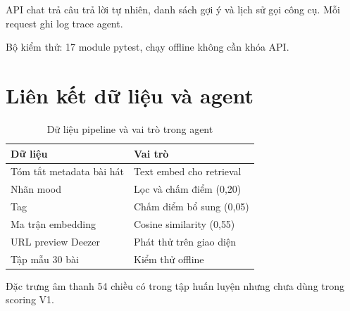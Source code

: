 API chat trả câu trả lời tự nhiên, danh sách gợi ý và lịch sử gọi công cụ. Mỗi request ghi log trace agent.

Bộ kiểm thử: 17 module pytest, chạy offline không cần khóa API.

\section{Liên kết dữ liệu và agent}

\begin{table}[htbp]
  \centering
  \caption{Dữ liệu pipeline và vai trò trong agent}
  \label{tab:data-agent}
  \begin{tabularx}{\textwidth}{@{}L{4cm}X@{}}
    \toprule
    \textbf{Dữ liệu} & \textbf{Vai trò} \\
    \midrule
    Tóm tắt metadata bài hát & Text embed cho retrieval \\
    Nhãn mood & Lọc và chấm điểm (0{,}20) \\
    Tag & Chấm điểm bổ sung (0{,}05) \\
    Ma trận embedding & Cosine similarity (0{,}55) \\
    URL preview Deezer & Phát thử trên giao diện \\
    Tập mẫu 30 bài & Kiểm thử offline \\
    \bottomrule
  \end{tabularx}
\end{table}

Đặc trưng âm thanh 54 chiều có trong tập huấn luyện nhưng chưa dùng trong scoring V1.
